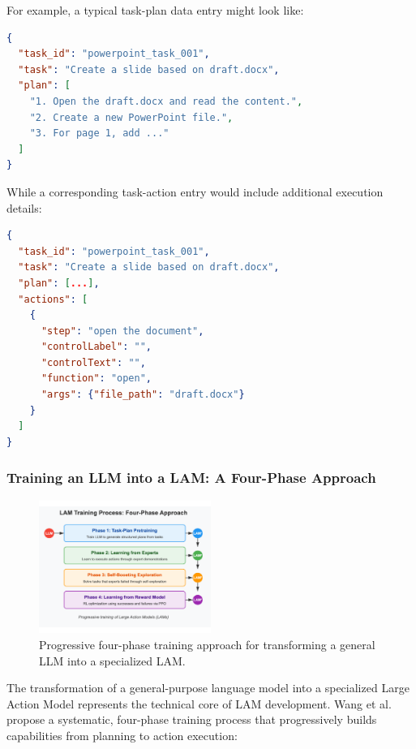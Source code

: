 \documentclass[journal,twoside,10pt]{IEEEtran}
\begin{document}
For example, a typical task-plan data entry might look like:

\begin{lstlisting}[language=JSON]
{
  "task_id": "powerpoint_task_001",
  "task": "Create a slide based on draft.docx",
  "plan": [
    "1. Open the draft.docx and read the content.",
    "2. Create a new PowerPoint file.",
    "3. For page 1, add ..."
  ]
}
\end{lstlisting}

While a corresponding task-action entry would include additional execution details:

\begin{lstlisting}[language=JSON]
{
  "task_id": "powerpoint_task_001",
  "task": "Create a slide based on draft.docx",
  "plan": [...],
  "actions": [
    {
      "step": "open the document",
      "controlLabel": "",
      "controlText": "",
      "function": "open",
      "args": {"file_path": "draft.docx"}
    }
  ]
}
\end{lstlisting}

\subsubsection{Training an LLM into a LAM: A Four-Phase Approach}

\begin{figure}[htbp]
    \centering
    \includegraphics[width=0.5\textwidth]{traning_phases.pdf}
    \caption{Progressive four-phase training approach for transforming a general LLM into a specialized LAM.}
    \label{fig:lam-training}
\end{figure}

The transformation of a general-purpose language model into a specialized Large Action Model represents the technical core of LAM development. Wang et al. \cite{wang2023lam} propose a systematic, four-phase training process that progressively builds capabilities from planning to action execution:
\end{document}
